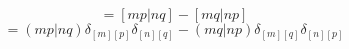 \documentclass[12pt]{article}
\begin{document}
\begin{equation}
    =[mp|nq]-[mq|np]
\end{equation}
\begin{equation}
    =(mp|nq)\delta _{[m][p]}\delta _{[n][q]}-(mq|np)\delta _{[m][q]}\delta _{[n][p]}
\end{equation}
\end{document}
